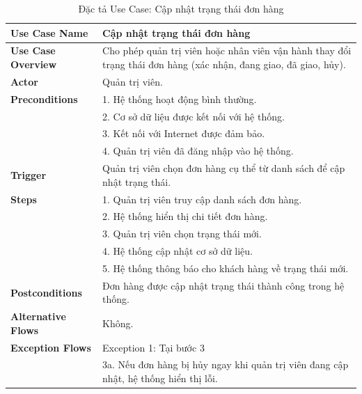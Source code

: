 {\begin{longtable}{|>{\bfseries}p{4cm}|p{11.5cm}|}
\caption{Đặc tả Use Case: Cập nhật trạng thái đơn hàng}
\label{tab:uc-admin-update-order-status} \\
\hline
\textbf{Use Case Name} & Cập nhật trạng thái đơn hàng \\
\hline
\textbf{Use Case Overview} & Cho phép quản trị viên hoặc nhân viên vận hành thay đổi trạng thái đơn hàng (xác nhận, đang giao, đã giao, hủy). \\
\hline
\textbf{Actor} & Quản trị viên. \\
\hline
\textbf{Preconditions} & 1. Hệ thống hoạt động bình thường. \\
& 2. Cơ sở dữ liệu được kết nối với hệ thống. \\
& 3. Kết nối với Internet được đảm bảo. \\
& 4. Quản trị viên đã đăng nhập vào hệ thống. \\
\hline
\textbf{Trigger} & Quản trị viên chọn đơn hàng cụ thể từ danh sách để cập nhật trạng thái. \\
\hline
\textbf{Steps} & 1. Quản trị viên truy cập danh sách đơn hàng. \\
& 2. Hệ thống hiển thị chi tiết đơn hàng. \\
& 3. Quản trị viên chọn trạng thái mới. \\
& 4. Hệ thống cập nhật cơ sở dữ liệu. \\
& 5. Hệ thống thông báo cho khách hàng về trạng thái mới. \\
\hline
\textbf{Postconditions} & Đơn hàng được cập nhật trạng thái thành công trong hệ thống. \\
\hline
\textbf{Alternative Flows} & Không. \\
\hline
\textbf{Exception Flows} & Exception 1: Tại bước 3 \\
& 3a. Nếu đơn hàng bị hủy ngay khi quản trị viên đang cập nhật, hệ thống hiển thị lỗi. \\
\hline
\end{longtable}

}
